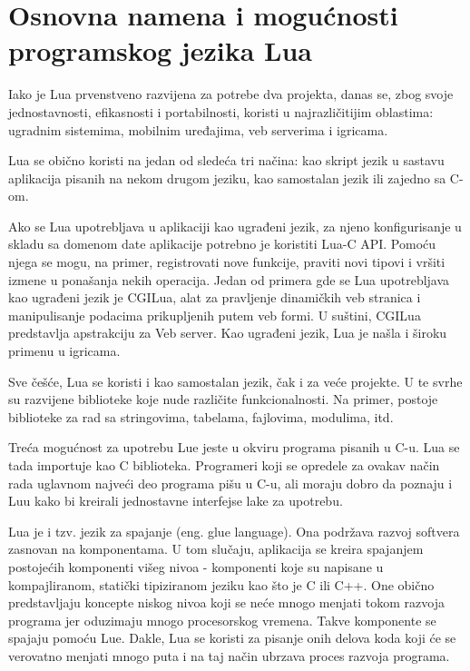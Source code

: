 \documentclass[a4paper]{article}
\begin{document}
\section{Osnovna namena i mogućnosti programskog jezika Lua}	
\label{sec:namena_i_mogucnosti}

Iako je Lua prvenstveno razvijena za potrebe dva projekta, danas se, zbog svoje jednostavnosti, efikasnosti i portabilnosti, koristi u najrazličitijim oblastima: ugradnim sistemima, mobilnim uređajima, veb serverima i igricama.

Lua se obično koristi na jedan od sledeća tri načina: kao skript jezik u sastavu aplikacija pisanih na nekom drugom jeziku, kao samostalan jezik ili zajedno sa C-om.\cite{bookProgInLua} 

Ako se Lua upotrebljava u aplikaciji kao ugrađeni jezik, za njeno konfigurisanje u skladu sa domenom date aplikacije potrebno je koristiti Lua-C API. Pomoću njega se mogu, na primer, registrovati nove funkcije, praviti novi tipovi i vršiti izmene u ponašanja nekih operacija. Jedan od primera gde se Lua upotrebljava kao ugrađeni jezik je CGILua, alat za pravljenje dinamičkih veb stranica i manipulisanje podacima prikupljenih putem veb formi. U suštini, CGILua predstavlja apstrakciju za Veb server.\cite{keplerProject} Kao ugrađeni jezik, Lua je našla i široku primenu u igricama.

Sve češće, Lua se koristi i kao samostalan jezik, čak i za veće projekte. U te svrhe su razvijene biblioteke koje nude različite funkcionalnosti. Na primer, postoje biblioteke za rad sa stringovima, tabelama, fajlovima, modulima, itd.

Treća mogućnost za upotrebu Lue jeste u okviru programa pisanih u C-u. Lua se tada importuje kao C biblioteka. Programeri koji se opredele za ovakav način rada uglavnom najveći deo programa pišu u C-u, ali moraju dobro da poznaju i Luu kako bi kreirali jednostavne interfejse lake za upotrebu.

Lua je i tzv. jezik za spajanje (eng. glue language). Ona podržava razvoj softvera zasnovan na komponentama. U tom slučaju, aplikacija se kreira spajanjem postojećih komponenti višeg nivoa - komponenti koje su napisane u kompajliranom, statički tipiziranom jeziku kao što je C ili C++. One obično predstavljaju koncepte niskog nivoa koji se neće mnogo menjati tokom razvoja programa jer oduzimaju mnogo procesorskog vremena. Takve komponente se spajaju pomoću Lue. Dakle, Lua se koristi za pisanje onih delova koda koji će se verovatno menjati mnogo puta i na taj način ubrzava proces razvoja programa.
\end{document}

